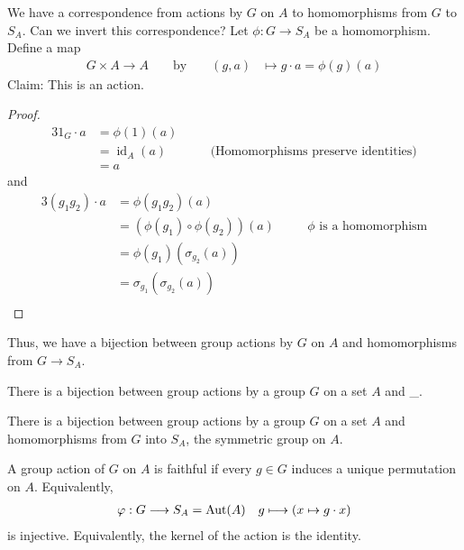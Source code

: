 \documentclass[a5paper]{article}
\begin{document}
\begin{remark}
  We have a correspondence from actions by $G$ on $A$ to homomorphisms from $G$
  to $S_A$. Can we invert this correspondence? Let $\phi:G\to S_A$ be a
  homomorphism. Define a map
  \begin{align*}
    G\times A\longrightarrow A
    &&\text{ by }&& (g,a)&\longmapsto g\cdot a=\phi(g)(a)
  \end{align*}
  Claim: This is an action.

  \begin{proof}
    \begin{alignat*}{3}
      1_G\cdot a &= \phi(1)(a) \\
      &= \operatorname{id}_A(a) &&\quad\text{(Homomorphisms preserve
        identities)} \\
      &= a
    \end{alignat*}
    and
    \begin{alignat*}{3}
      (g_1g_2)\cdot a &= \phi(g_1g_2)(a) \\
      &= (\phi(g_1)\circ\phi(g_2))(a) &&\quad\text{$\phi$ is a homomorphism} \\
      &= \phi(g_1)(\sigma_{g_2}(a)) \\
      &= \sigma_{g_1}(\sigma_{g_2}(a)) \\
    \end{alignat*}
  \end{proof}
  
  Thus, we have a bijection between group actions by $G$ on $A$ and
  homomorphisms from $G\to S_A$.
\end{remark}

\begin{note}
  \begin{field}
    There is a bijection between group actions by a group $G$ on a set $A$ and \_.
  \end{field}

  \begin{field}
    There is a bijection between group actions by a group $G$ on a set $A$ and
    homomorphisms from $G$ into $S_A$, the symmetric group on $A$.
  \end{field}
\end{note}

\begin{definition}
	A group action of $G$ on $A$ is faithful if every $g\in G$ induces a unique
  permutation on $A$. Equivalently,
  \begin{align*}
    \varphi:G\longrightarrow S_A=\operatorname{Aut}(A) && g\longmapsto (x\mapsto g\cdot x)
  \end{align*}
  is injective. Equivalently, the kernel of the action is the identity.
\end{definition}
\end{document}
